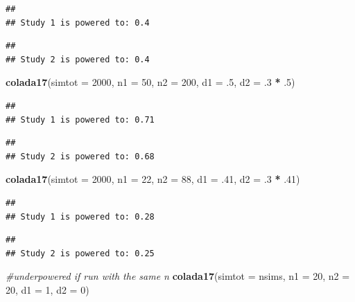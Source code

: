 \documentclass[]{book}
\newenvironment{Shaded}{\begin{snugshade}}{\end{snugshade}}
\newcommand{\CommentTok}[1]{\textcolor[rgb]{0.56,0.35,0.01}{\textit{#1}}}
\newcommand{\DataTypeTok}[1]{\textcolor[rgb]{0.13,0.29,0.53}{#1}}
\newcommand{\DecValTok}[1]{\textcolor[rgb]{0.00,0.00,0.81}{#1}}
\newcommand{\FloatTok}[1]{\textcolor[rgb]{0.00,0.00,0.81}{#1}}
\newcommand{\KeywordTok}[1]{\textcolor[rgb]{0.13,0.29,0.53}{\textbf{#1}}}
\newcommand{\NormalTok}[1]{#1}
\newcommand{\OperatorTok}[1]{\textcolor[rgb]{0.81,0.36,0.00}{\textbf{#1}}}
\newcommand{\StringTok}[1]{\textcolor[rgb]{0.31,0.60,0.02}{#1}}
\begin{document}
\begin{verbatim}
## 
## Study 1 is powered to: 0.4
\end{verbatim}

\begin{verbatim}
## 
## Study 2 is powered to: 0.4
\end{verbatim}

\begin{Shaded}
\begin{Highlighting}[]
  \KeywordTok{colada17}\NormalTok{(}\DataTypeTok{simtot =} \DecValTok{2000}\NormalTok{, }\DataTypeTok{n1 =} \DecValTok{50}\NormalTok{, }\DataTypeTok{n2 =} \DecValTok{200}\NormalTok{, }\DataTypeTok{d1 =} \FloatTok{.5}\NormalTok{, }\DataTypeTok{d2 =} \FloatTok{.3} \OperatorTok{*}\StringTok{ }\FloatTok{.5}\NormalTok{)}
\end{Highlighting}
\end{Shaded}

\begin{verbatim}
## 
## Study 1 is powered to: 0.71
\end{verbatim}

\begin{verbatim}
## 
## Study 2 is powered to: 0.68
\end{verbatim}

\begin{Shaded}
\begin{Highlighting}[]
  \KeywordTok{colada17}\NormalTok{(}\DataTypeTok{simtot =} \DecValTok{2000}\NormalTok{, }\DataTypeTok{n1 =} \DecValTok{22}\NormalTok{, }\DataTypeTok{n2 =} \DecValTok{88}\NormalTok{, }\DataTypeTok{d1 =} \FloatTok{.41}\NormalTok{, }\DataTypeTok{d2 =} \FloatTok{.3} \OperatorTok{*}\StringTok{ }\FloatTok{.41}\NormalTok{)}
\end{Highlighting}
\end{Shaded}

\begin{verbatim}
## 
## Study 1 is powered to: 0.28
\end{verbatim}

\begin{verbatim}
## 
## Study 2 is powered to: 0.25
\end{verbatim}

\begin{Shaded}
\begin{Highlighting}[]
\CommentTok{#underpowered if run with the same n}
\KeywordTok{colada17}\NormalTok{(}\DataTypeTok{simtot =}\NormalTok{ nsims, }\DataTypeTok{n1 =} \DecValTok{20}\NormalTok{, }\DataTypeTok{n2 =} \DecValTok{20}\NormalTok{, }\DataTypeTok{d1 =} \DecValTok{1}\NormalTok{, }\DataTypeTok{d2 =} \DecValTok{0}\NormalTok{)  }
\end{Highlighting}
\end{Shaded}
\end{document}

